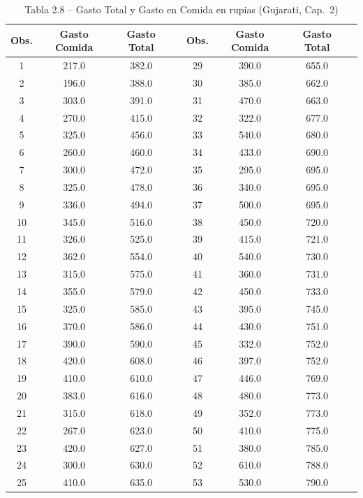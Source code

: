 \documentclass[12pt,a4paper]{article}
\begin{document}
\begin{table}[H]
\centering
\caption{Tabla 2.8 -- Gasto Total y Gasto en Comida en rupias (Gujarati, Cap.\ 2)}
\label{tab:datos}
\small
\begin{tabular}{cccc|cccc}
\toprule
\textbf{Obs.} & \textbf{Gasto Comida} & \textbf{Gasto Total} & \phantom{x}
 & \textbf{Obs.} & \textbf{Gasto Comida} & \textbf{Gasto Total} & \\
\midrule
 1 & 217.0 & 382.0 & &  29 & 390.0 & 655.0 & \\
 2 & 196.0 & 388.0 & &  30 & 385.0 & 662.0 & \\
 3 & 303.0 & 391.0 & &  31 & 470.0 & 663.0 & \\
 4 & 270.0 & 415.0 & &  32 & 322.0 & 677.0 & \\
 5 & 325.0 & 456.0 & &  33 & 540.0 & 680.0 & \\
 6 & 260.0 & 460.0 & &  34 & 433.0 & 690.0 & \\
 7 & 300.0 & 472.0 & &  35 & 295.0 & 695.0 & \\
 8 & 325.0 & 478.0 & &  36 & 340.0 & 695.0 & \\
 9 & 336.0 & 494.0 & &  37 & 500.0 & 695.0 & \\
10 & 345.0 & 516.0 & &  38 & 450.0 & 720.0 & \\
11 & 326.0 & 525.0 & &  39 & 415.0 & 721.0 & \\
12 & 362.0 & 554.0 & &  40 & 540.0 & 730.0 & \\
13 & 315.0 & 575.0 & &  41 & 360.0 & 731.0 & \\
14 & 355.0 & 579.0 & &  42 & 450.0 & 733.0 & \\
15 & 325.0 & 585.0 & &  43 & 395.0 & 745.0 & \\
16 & 370.0 & 586.0 & &  44 & 430.0 & 751.0 & \\
17 & 390.0 & 590.0 & &  45 & 332.0 & 752.0 & \\
18 & 420.0 & 608.0 & &  46 & 397.0 & 752.0 & \\
19 & 410.0 & 610.0 & &  47 & 446.0 & 769.0 & \\
20 & 383.0 & 616.0 & &  48 & 480.0 & 773.0 & \\
21 & 315.0 & 618.0 & &  49 & 352.0 & 773.0 & \\
22 & 267.0 & 623.0 & &  50 & 410.0 & 775.0 & \\
23 & 420.0 & 627.0 & &  51 & 380.0 & 785.0 & \\
24 & 300.0 & 630.0 & &  52 & 610.0 & 788.0 & \\
25 & 410.0 & 635.0 & &  53 & 530.0 & 790.0 & \\

\end{tabular}
\end{table}
\end{document}
